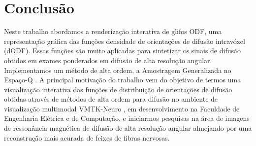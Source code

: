 \documentclass[
    12pt,                %
    oneside,            %
    a4paper,            %
    english,            %
    french,                %
    spanish,            %
    brazil                %
    ]{abntex2}
\begin{document}



%
%


%
%


\chapter{Conclusão}
\label{chap::conclusao}


Neste trabalho abordamos a renderização interativa de glifos ODF, uma representação gráfica das funções densidade de orientações de difusão intravóxel (dODF). Essas funções são muito aplicadas para sintetizar os sinais de difusão obtidos em exames ponderados em difusão de alta resolução angular. Implementamos um método de alta ordem, a Amostragem Generalizada no Espaço-Q \cite{yeh2010}. A principal motivação do trabalho vem do objetivo de termos uma visualização interativa das funções de distribuição de orientações de difusão obtidas através de métodos de alta ordem para difusão no ambiente de visualização multimodal VMTK-Neuro \cite{VMTKNeuro}, em desenvolvimento na Faculdade de Engenharia Elétrica e de Computação, e iniciarmos pesquisas na área de imagens de ressonância magnética de difusão de alta resolução angular almejando por uma reconstrução mais acurada de feixes de fibras nervosas.
\end{document}
